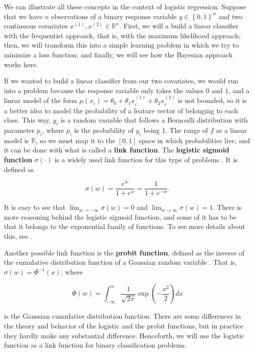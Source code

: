 We can illustrate all these concepts in the context of logistic regression. Suppose that we have $n$ observations of a binary response variable $y \in \left\{0, 1\right\}^n$ and two continuous covariates $x^{(1)}, x^{(2)} \in \mathbb{R}^n$. First, we will a build a linear classifier with the frequentist approach, that is, with the maximum likelihood approach; then, we will transform this into a simple learning problem in which we try to minimize a loss function; and finally, we will see how the Bayesian approach works here.

If we wanted to build a linear classifier from our two covariates, we would run into a problem because the response variable only takes the values $0$ and $1$, and a linear model of the form $\mu(x_i) = \theta_0 + \theta_1 x_i^{(1)} + \theta_2 x_i^{(2)}$ is not bounded, so it is a better idea to model the probability of a feature vector of belonging to each class.
This way, $y_i$ is a random variable that follows a Bernoulli distribution with parameter $p_i$, where $p_i$ is the probability of $y_i$ being 1.
The range of $f$ as a linear model is $\mathbb{R}$, so we must map it to the $\left[ 0,1 \right]$ space in which probabilities live, and it can be done with what is called a \textbf{link function}. The \textbf{logistic sigmoid function} $\sigma \left( \cdot \right)$ is a widely used link function for this type of problems \cite[p.~114]{christopher2006pattern}. It is defined as

$$
  \sigma(w) = \frac{e^w}{1 + e^w} = \frac{1}{1 + e^{-w}}.
$$

It is easy to see that $\lim_{w \to -\infty} \sigma(w) = 0$ and $\lim_{w \to \infty} \sigma(w) = 1$. There is more reasoning behind the logistic sigmoid function, and some of it has to be that it belongs to the exponential family of functions. To see more details about this, see \cite{christopher2006pattern}.

Another possible link function is the \textbf{probit function}, defined as the inverse of the cumulative distribution function of a Gaussian random variable \cite[p.~296]{friedman2001elements}. That is, $\sigma(w) = \Phi^{-1}\left( x \right)$,
where

$$
  \Phi(w) = \int_{-\infty}^w \frac{1}{\sqrt{2 \pi}} \exp{\left( -\frac{x^2}{2} \right)} dx
$$

is the Gaussian cumulative distribution function. There are some differences in the theory and behavior of the logistic and the probit functions, but in practice they hardly make any substantial difference. Henceforth, we will use the logistic function as a link function for binary classification problems.

